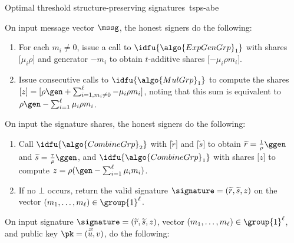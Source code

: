 \begin{protocolbox}{Optimal threshold structure-preserving
  signatures~\cite{C:AGHO11}}{tsps-abe}
\begin{description}
\begin{enumerate}
    \end{enumerate}

  \item[$\lbrack \signature\rbrack _{\algo{OnSign}} \sample
    \algo{OnSign}(\mssg)$ :] On input message vector $\mssg$, the honest
    signers do the following:

    \begin{enumerate}

      \item For each ${m}_i \neq 0$, issue a call to
        $\idfu{\algo{ExpGenGrp}_1}$ with shares $\lbrack \mu_i\rho\rbrack $ and
        generator $-{m}_i$ to obtain $t$-additive shares $\lbrack
        -\mu_i\rho{m}_i\rbrack $.

      \item Issue consecutive calls to $\idfu{\algo{MulGrp}_1}$ to compute the
        shares $\lbrack {z}\rbrack  = \lbrack \rho\gen + \sum_{i=1, {m}_i \neq
        0}^\ell {-\mu_i\rho{m}_i}\rbrack $, noting that this sum is equivalent
        to $\rho\gen - \sum_{i=1}^\ell \mu_i\rho{m}_i$.

    \end{enumerate}

  \item[$\signature \leftarrow \TSPScombine(\lbrack \signature\rbrack )$ :] On
    input the signature shares, the honest signers do the following:

    \begin{enumerate}

      \item Call $\idfu{\algo{CombineGrp}_2}$ with $\lbrack
        \widetilde{r}\rbrack $ and $\lbrack \widetilde{s}\rbrack $ to obtain
        $\widetilde{r} = \tfrac{1}{\rho}\ggen$ and $\widetilde{s} =
        \tfrac{\tau}{\rho}\ggen$, and $\idfu{\algo{CombineGrp}_1}$ with shares
        $\lbrack {z}\rbrack $ to compute ${z} = \rho(\gen - \sum_{i=1}^\ell
        \mu_i{m}_i)$.

      \item If no $\bot$ occurs, return the valid signature $\signature =
        (\widetilde{r}, \widetilde{s}, {z})$ on the vector $({m}_1,
        \ldots,{m}_\ell) \in \group{1}^\ell$.

    \end{enumerate}

  \item[$\{0,1\} \leftarrow \SPSverify(\pk, \mssg, \signature)$ :] On input
    signature $\signature = (\widetilde{r}, \widetilde{s}, {z})$, vector
    $({m}_1, \ldots, {m}_\ell) \in \group{1}^\ell$, and public key $\pk =
    (\vec{\widetilde{u}}, {v})$, do the following:


\end{description}
\end{protocolbox}
